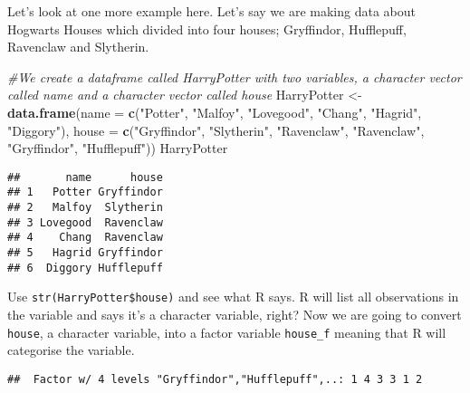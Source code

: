 \documentclass[
]{book}
\newenvironment{Shaded}{\begin{snugshade}}{\end{snugshade}}
\newcommand{\AttributeTok}[1]{\textcolor[rgb]{0.13,0.29,0.53}{#1}}
\newcommand{\CommentTok}[1]{\textcolor[rgb]{0.56,0.35,0.01}{\textit{#1}}}
\newcommand{\FunctionTok}[1]{\textcolor[rgb]{0.13,0.29,0.53}{\textbf{#1}}}
\newcommand{\NormalTok}[1]{#1}
\newcommand{\OtherTok}[1]{\textcolor[rgb]{0.56,0.35,0.01}{#1}}
\newcommand{\SpecialCharTok}[1]{\textcolor[rgb]{0.81,0.36,0.00}{\textbf{#1}}}
\newcommand{\StringTok}[1]{\textcolor[rgb]{0.31,0.60,0.02}{#1}}
\begin{document}
Let's look at one more example here. Let's say we are making data about Hogwarts Houses which divided into four houses; Gryffindor, Hufflepuff, Ravenclaw and Slytherin.

\begin{Shaded}
\begin{Highlighting}[]
\CommentTok{\#We create a dataframe called HarryPotter with two variables, a character vector called name and a character vector called house}
\NormalTok{HarryPotter }\OtherTok{\textless{}{-}} \FunctionTok{data.frame}\NormalTok{(}\AttributeTok{name =} \FunctionTok{c}\NormalTok{(}\StringTok{"Potter"}\NormalTok{, }\StringTok{"Malfoy"}\NormalTok{, }\StringTok{"Lovegood"}\NormalTok{, }\StringTok{"Chang"}\NormalTok{, }\StringTok{"Hagrid"}\NormalTok{, }\StringTok{"Diggory"}\NormalTok{), }\AttributeTok{house =} \FunctionTok{c}\NormalTok{(}\StringTok{"Gryffindor"}\NormalTok{, }\StringTok{"Slytherin"}\NormalTok{, }\StringTok{"Ravenclaw"}\NormalTok{, }\StringTok{"Ravenclaw"}\NormalTok{, }\StringTok{"Gryffindor"}\NormalTok{, }\StringTok{"Hufflepuff"}\NormalTok{))}
\NormalTok{HarryPotter}
\end{Highlighting}
\end{Shaded}

\begin{verbatim}
##       name      house
## 1   Potter Gryffindor
## 2   Malfoy  Slytherin
## 3 Lovegood  Ravenclaw
## 4    Chang  Ravenclaw
## 5   Hagrid Gryffindor
## 6  Diggory Hufflepuff
\end{verbatim}

Use \texttt{str(HarryPotter\$house)} and see what R says. R will list all observations in the variable and says it's a character variable, right? Now we are going to convert \texttt{house}, a character variable, into a factor variable \texttt{house\_f} meaning that R will categorise the variable.

\begin{Shaded}
\end{Shaded}

\begin{verbatim}
##  Factor w/ 4 levels "Gryffindor","Hufflepuff",..: 1 4 3 3 1 2
\end{verbatim}
\end{document}
